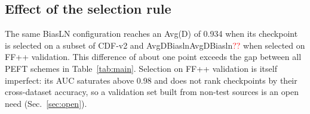 \documentclass[fonts]{icst}
\newcommand{\num}[1]{\ifcsname #1\endcsname\csname #1\endcsname\else\textcolor{red}{??}\fi}
\begin{document}
\subsection{Effect of the selection rule}
\label{sec:selection}
The same BiasLN configuration reaches an Avg(D) of 0.934 when its checkpoint is selected on a subset of CDF-v2 and \num{AvgDBiasln} when selected on FF++ validation. This difference of about one point exceeds the gap between all PEFT schemes in Table~\ref{tab:main}. Selection on FF++ validation is itself imperfect: its AUC saturates above 0.98 and does not rank checkpoints by their cross-dataset accuracy, so a validation set built from non-test sources is an open need (Sec.~\ref{sec:open}).

\begin{table}[!t]
\centering
\caption{Video AUC of re-trained schemes under one protocol (FF++ c23 training, checkpoint selected on FF++ validation). Avg(D) and Avg(M) are mean $\pm$ std over $n$ seeds; per-dataset values are seed means. Bold: best; shaded: second best.}
\label{tab:main}
\resizebox{\textwidth}{!}{}
\vspace{3mm}
\caption{Ablation of selective and low-rank schemes and of $L_2$ normalization before the classifier (same protocol). Bold: best; shaded: second best.}
\label{tab:ablation}
\resizebox{0.85\textwidth}{!}{}
\end{table}
\end{document}
